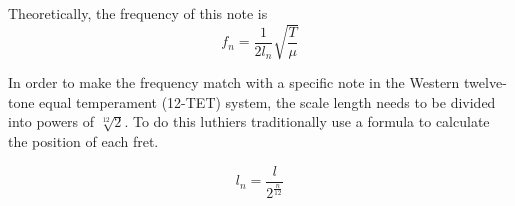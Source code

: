 Theoretically, the frequency of this note is 
\begin{equation}\label{eqn5}
    f_n = \frac{1}{2l_n}\sqrt{\frac{T}{\mu}}
\end{equation}

In order to make the frequency match with a specific note in the Western twelve-tone equal temperament (12-TET) system, the scale length needs to be divided into powers of $\sqrt[12]{2}$. To do this luthiers traditionally use a formula to calculate the position of each fret. \cite{eqn6}

\begin{equation}\label{eqn6}
    l_n=\frac{l}{2^\frac{n}{12}}
\end{equation}